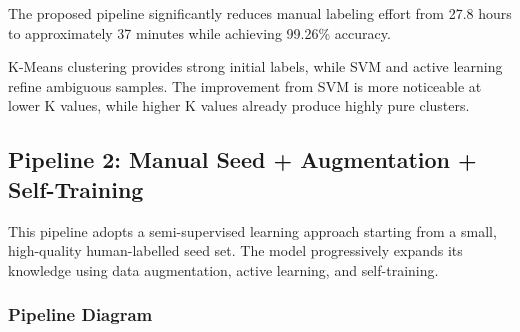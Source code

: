 \documentclass[12pt,a4paper]{article}
\begin{document}
The proposed pipeline significantly reduces manual labeling effort from 27.8 hours to approximately 37 minutes while achieving 99.26\% accuracy.

K-Means clustering provides strong initial labels, while SVM and active learning refine ambiguous samples. The improvement from SVM is more noticeable at lower K values, while higher K values already produce highly pure clusters.

\subsection{Pipeline 2: Manual Seed + Augmentation + Self-Training}

This pipeline adopts a semi-supervised learning approach starting from a small, high-quality human-labelled seed set. The model progressively expands its knowledge using data augmentation, active learning, and self-training.

\subsubsection{Pipeline Diagram}
\end{document}
